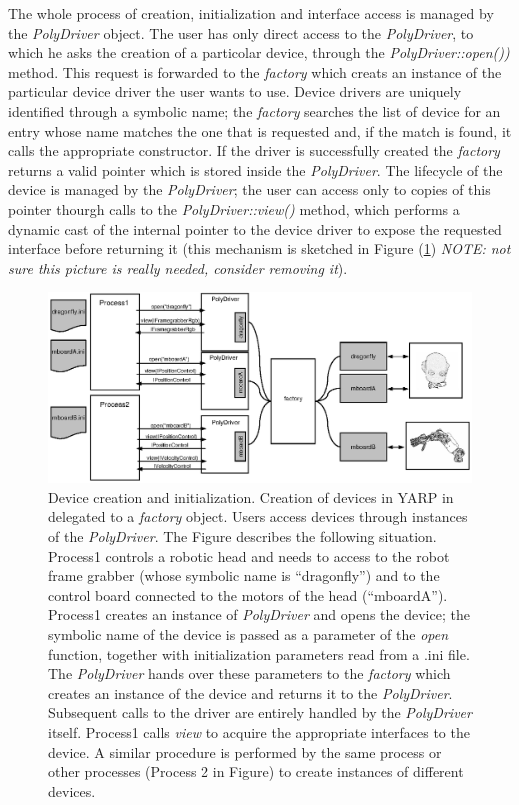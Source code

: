 The whole process of creation, initialization and interface access is 
managed by the \emph{PolyDriver} object. The user has only direct access 
to the \emph{PolyDriver}, to which he asks the creation of a particolar 
device, through the \emph{PolyDriver::open())} method. This request is 
forwarded to the \emph{factory} which creats an instance of the particular 
device driver the user wants to use. Device drivers are uniquely identified 
through a symbolic name; the \emph{factory} searches the list of device 
for an entry whose name matches the one that is requested and, if the match 
is found, it calls the appropriate constructor. If the driver is successfully 
created the \emph{factory} returns a valid pointer which is stored inside 
the \emph{PolyDriver}. The lifecycle of the device is managed by the 
\emph{PolyDriver}; the user can access only to copies of this pointer 
thourgh calls to the \emph{PolyDriver::view()} method, which performs 
a dynamic cast of the internal pointer to the device driver to expose 
the requested interface before returning it (this mechanism is sketched 
in Figure (\ref{fig:devices4}) \emph{NOTE: not sure this picture is 
really needed, consider removing it}).

\begin{figure}[tbp]
\centerline{
\includegraphics[width=20cm]{fig-devices4}
}
\caption{Device creation and initialization. Creation of 
devices in YARP in delegated to a \emph{factory} object. Users 
access devices through instances of the \emph{PolyDriver}. The 
Figure describes the following situation. Process1 controls a robotic
head and needs to access to the robot frame grabber (whose symbolic name 
is ``dragonfly'') and to the control board connected to the motors of 
the head (``mboardA''). Process1 creates an instance of 
\emph{PolyDriver} and opens 
the device; the symbolic name of the device is passed as a parameter
of the \emph{open} function, together with initialization parameters 
read from a .ini file. The \emph{PolyDriver} hands over these parameters 
to the \emph{factory} which creates an instance of the device and returns
it to the \emph{PolyDriver}. Subsequent calls to the driver are entirely 
handled by the \emph{PolyDriver} itself. Process1 calls \emph{view} to 
acquire the appropriate interfaces to the device. A similar procedure 
is performed by the same process or other processes (Process 2 in Figure) 
to create instances of different devices.}\label{fig:devices4}
\end{figure}

